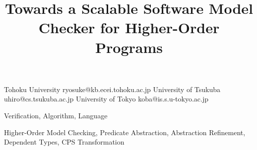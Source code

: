\documentclass[preprint]{sigplanconf}
\begin{document}
\copyrightdata{[to be supplied]}

\title{Towards a Scalable Software Model Checker for Higher-Order Programs}

           {Tohoku University}
           {ryosuke@kb.ecei.tohoku.ac.jp}
           {University of Tsukuba}
           {uhiro@cs.tsukuba.ac.jp}
           {University of Tokyo}
           {koba@is.s.u-tokyo.ac.jp}

\maketitle




\terms
Verification, Algorithm, Language

\keywords
Higher-Order Model Checking,
Predicate Abstraction, Abstraction Refinement,
Dependent Types, CPS Transformation


%










\vspace{-5pt}




%
\end{document}
